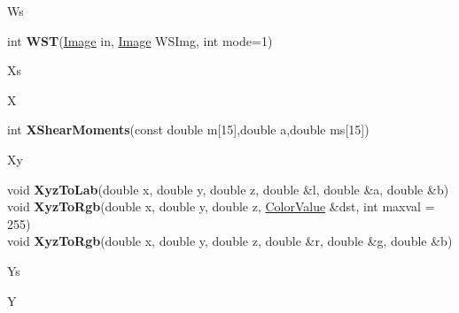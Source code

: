 \documentclass[10pt,titlepage]{article}
\def\functionlistentry#1#2#3#4#5#6{\noindent #1 {\bf #2}(#3) \dotfill #6\\}
\def\letterref#1{}
\def\letterlabel#1{\vspace{0.5cm}\centerline{\Large #1}}
\def\letterlabelend#1{}
\begin{document}
{{\letterlabel{Ws}
\letterref{A}
\letterref{B}
\letterref{C}
\letterref{D}
\letterref{E}
\letterref{F}
\letterref{G}
\letterref{H}
\letterref{I}
\letterref{K}
\letterref{L}
\letterref{M}
\letterref{N}
\letterref{O}
\letterref{P}
\letterref{Q}
\letterref{R}
\letterref{S}
\letterref{T}
\letterref{U}
\letterref{V}
\letterref{W}
\letterref{X}
\letterref{Y}
\letterref{Z}

\letterref{Wa}
\letterref{We}
\letterref{Wh}
\letterref{Wi}
\letterref{Wr}
\letterref{Ws}
\letterlabelend{Ws}
\functionlistentry{int}{WST}{\hyperlink{Image}{Image} in, \hyperlink{Image}{Image} WSImg, int mode=1}{1143}{segmentation}{}

\letterlabel{Xs}
\letterlabel{X}
\letterref{A}
\letterref{B}
\letterref{C}
\letterref{D}
\letterref{E}
\letterref{F}
\letterref{G}
\letterref{H}
\letterref{I}
\letterref{K}
\letterref{L}
\letterref{M}
\letterref{N}
\letterref{O}
\letterref{P}
\letterref{Q}
\letterref{R}
\letterref{S}
\letterref{T}
\letterref{U}
\letterref{V}
\letterref{W}
\letterref{X}
\letterref{Y}
\letterref{Z}

\letterref{Xs}
\letterref{Xy}
\letterlabelend{Xs}
\functionlistentry{int}{XShearMoments}{const double m[15],double a,double ms[15]}{1609}{obsolet}{}

\letterlabel{Xy}
\letterref{A}
\letterref{B}
\letterref{C}
\letterref{D}
\letterref{E}
\letterref{F}
\letterref{G}
\letterref{H}
\letterref{I}
\letterref{K}
\letterref{L}
\letterref{M}
\letterref{N}
\letterref{O}
\letterref{P}
\letterref{Q}
\letterref{R}
\letterref{S}
\letterref{T}
\letterref{U}
\letterref{V}
\letterref{W}
\letterref{X}
\letterref{Y}
\letterref{Z}

\letterref{Xs}
\letterref{Xy}
\letterlabelend{Xy}
\functionlistentry{void}{XyzToLab}{double x, double y, double z, double \&l, double \&a, double \&b}{313}{datastructures}{}
\functionlistentry{void}{XyzToRgb}{double x, double y, double z, \hyperlink{ColorValue}{ColorValue} \&dst, int maxval = 255}{305}{datastructures}{}
\functionlistentry{void}{XyzToRgb}{double x, double y, double z, double \&r, double \&g, double \&b}{312}{datastructures}{}

\letterlabel{Ys}
\letterlabel{Y}
\letterref{A}
\letterref{B}
\letterref{C}
\letterref{D}
\letterref{E}
\letterref{F}
\letterref{G}
\letterref{H}
\letterref{I}
\letterref{K}
\letterref{L}
\letterref{M}
\letterref{N}
\letterref{O}
\letterref{P}
\letterref{Q}
\letterref{R}
\letterref{S}
\letterref{T}
\letterref{U}
\letterref{V}
\letterref{W}
\letterref{X}
\letterref{Y}
\letterref{Z}

}}
\end{document}
